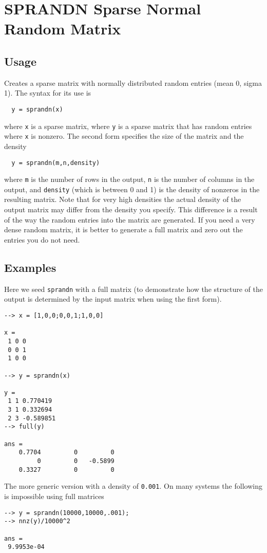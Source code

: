 \section{SPRANDN Sparse Normal Random Matrix}

\subsection{Usage}

Creates a sparse matrix with normally distributed random entries (mean 0, sigma 1).  The
syntax for its use is
\begin{verbatim}
  y = sprandn(x)
\end{verbatim}
where \verb|x| is a sparse matrix, where \verb|y| is a sparse matrix that has
random entries where \verb|x| is nonzero.  The second form specifies the
size of the matrix and the density
\begin{verbatim}
  y = sprandn(m,n,density)
\end{verbatim}
where \verb|m| is the number of rows in the output, \verb|n| is the number of 
columns in the output, and \verb|density| (which is between 0 and 1) is
the density of nonzeros in the resulting matrix.  Note that for very
high densities the actual density of the output matrix may differ from
the density you specify.  This difference is a result of the way the
random entries into the matrix are generated.  If you need a very dense
random matrix, it is better to generate a full matrix and zero out the 
entries you do not need.
\subsection{Examples}

Here we seed \verb|sprandn| with a full matrix (to demonstrate how the structure
of the output is determined by the input matrix when using the first form).
\begin{verbatim}
--> x = [1,0,0;0,0,1;1,0,0]

x = 
 1 0 0 
 0 0 1 
 1 0 0 

--> y = sprandn(x)

y = 
 1 1 0.770419
 3 1 0.332694
 2 3 -0.589851
--> full(y)

ans = 
    0.7704         0         0 
         0         0   -0.5899 
    0.3327         0         0 
\end{verbatim}
The more generic version with a density of \verb|0.001|.  On many systems the
following is impossible using full matrices
\begin{verbatim}
--> y = sprandn(10000,10000,.001);
--> nnz(y)/10000^2

ans = 
 9.9953e-04 
\end{verbatim}
